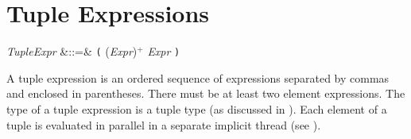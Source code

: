 %
%
%
%

\section{Tuple Expressions}

\begin{Grammar}
\emph{TupleExpr} &::=& \texttt( (\emph{Expr}\EXP{,})$^+$ \emph{Expr} \texttt)\\
\end{Grammar}

A tuple expression is an ordered sequence of expressions separated by commas
and enclosed in parentheses.  There must be at least two element expressions.
The type of a tuple expression
is a tuple type (as discussed in ).
Each element of a tuple is evaluated in parallel in a separate implicit thread (see
).
